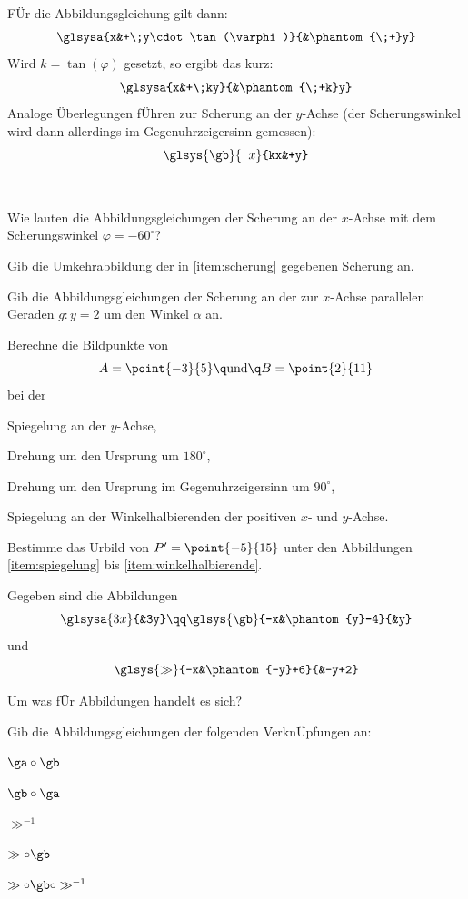 \documentclass[%
11pt,%
twoside,%
titlepage,%
german,%
headsepline%
]{scrartcl}
\begin{document}
\noindent F\"Ur die Abbildungsgleichung gilt dann:
$$\glsysa{x&+\;y\cdot\tan(\varphi)}{&\phantom{\;+}y}$$
Wird $k = \tan(\varphi)$ gesetzt, so ergibt das kurz:
$$\glsysa{x&+\;ky}{&\phantom{\;+k}y}$$
Analoge \"Uberlegungen f\"Uhren zur Scherung an der $y$-Achse (der Scherungswinkel wird dann allerdings im Gegenuhrzeigersinn gemessen):
$$\glsys{\gb}{\phantom{k}x}{kx&+y}$$

\begin{ueb}
\ \\[-4ex]
\begin{enumeratea}
\item\label{item:scherung} Wie lauten die Abbildungsgleichungen der Scherung an der $x$-Achse mit dem Scherungswinkel $\varphi = -60^\circ$?
\item Gib die Umkehrabbildung der in \eqref{item:scherung} gegebenen Scherung an.
\item Gib die Abbildungsgleichungen der Scherung an der zur $x$-Achse parallelen Geraden $g:y=2$ um den Winkel $\alpha$ an.
\end{enumeratea}
\end{ueb}

\begin{ueb}
Berechne die Bildpunkte von
$$A = \point{-3}{5}\q\text{und}\q B = \point{2}{11}$$
bei der
\begin{enumeratea}
\item\label{item:spiegelung} Spiegelung an der $y$-Achse,
\item Drehung um den Ursprung um $180^\circ$,
\item Drehung um den Ursprung im Gegenuhrzeigersinn um $90^\circ$,
\item\label{item:winkelhalbierende} Spiegelung an der Winkelhalbierenden der positiven $x$- und $y$-Achse.
\item Bestimme das Urbild von $P' = \point{-5}{15}$ unter den Abbildungen \eqref{item:spiegelung} bis \eqref{item:winkelhalbierende}.
\end{enumeratea}
\end{ueb}

\begin{ueb}\label{ueb:verketten}
Gegeben sind die Abbildungen
$$\glsysa{3x}{&3y}\qq\glsys{\gb}{-x&\phantom{y}-4}{&y}$$
und
$$\glsys{\gg}{-x&\phantom{-y}+6}{&-y+2}$$
\begin{enumeratea}
\item Um was f\"Ur Abbildungen handelt es sich?
\item Gib die Abbildungsgleichungen der folgenden Verkn\"Upfungen an:
\begin{enumeratei}
\item $\ga\circ\gb$
\item $\gb\circ\ga$
\item $\gg^{-1}$
\item $\gg\circ\gb$
\item $\gg\circ\gb\circ\gg^{-1}$
\end{enumeratei}
\end{enumeratea}
\end{ueb}
\end{document}
